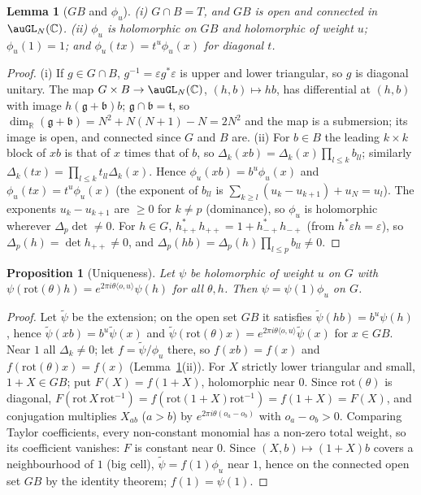 \documentclass[10pt]{amsart}
\newtheorem{proposition}[theorem]{Proposition}
\newtheorem{lemma}[theorem]{Lemma}
\theoremstyle{definition}
\theoremstyle{remark}
\newcommand{\C}{\mathbb C}
\newcommand{\R}{\mathbb R}
\begin{document}
\begin{lemma}[$G B$ and $\phi_u$]\label{psq:GB}
\textup{(i)} $G\cap B=T$, and $GB$ is open and connected in $\auGL_N(\C)$. \textup{(ii)} $\phi_u$ is
holomorphic on $GB$ and holomorphic of weight $u$; $\phi_u(1)=1$; and $\phi_u(tx)=t^u\phi_u(x)$ for
diagonal $t$.
\end{lemma}
\begin{proof}
(i) If $g\in G\cap B$, $g^{-1}=\varepsilon g^*\varepsilon$ is upper and lower triangular, so $g$ is diagonal
unitary. The map $G\times B\to\auGL_N(\C)$, $(h,b)\mapsto hb$, has differential at $(h,b)$ with image
$h(\mathfrak g+\mathfrak b)b$; $\mathfrak g\cap\mathfrak b=\mathfrak t$, so $\dim_\R(\mathfrak g+\mathfrak b)
=N^2+N(N+1)-N=2N^2$ and the map is a submersion; its image is open, and connected since $G$ and $B$
are. (ii) For $b\in B$ the leading $k\times k$ block of $xb$ is that of $x$ times that of $b$, so
$\Delta_k(xb)=\Delta_k(x)\prod_{l\le k}b_{ll}$; similarly $\Delta_k(tx)=\prod_{l\le k}t_{ll}\Delta_k(x)$.
Hence $\phi_u(xb)=b^u\phi_u(x)$ and $\phi_u(tx)=t^u\phi_u(x)$ (the exponent of $b_{ll}$ is
$\sum_{k\ge l}(u_k-u_{k+1})+u_N=u_l$). The exponents $u_k-u_{k+1}$ are $\ge0$ for $k\ne p$ (dominance),
so $\phi_u$ is holomorphic wherever $\Delta_p\det\ne0$. For $h\in G$, $h_{++}^*h_{++}=1+h_{-+}^*h_{-+}$
(from $h^*\varepsilon h=\varepsilon$), so $\Delta_p(h)=\det h_{++}\ne0$, and $\Delta_p(hb)=\Delta_p(h)\prod_{l\le p}
b_{ll}\ne0$.
\end{proof}

\begin{proposition}[Uniqueness]\label{psq:unique}
Let $\psi$ be holomorphic of weight $u$ on $G$ with $\psi(\mathrm{rot}(\theta)h)=e^{2\pi i\theta\langle
o,u\rangle}\psi(h)$ for all $\theta,h$. Then $\psi=\psi(1)\phi_u$ on $G$.
\end{proposition}
\begin{proof}
Let $\tilde\psi$ be the extension; on the open set $GB$ it satisfies $\tilde\psi(hb)=b^u\psi(h)$, hence
$\tilde\psi(xb)=b^u\tilde\psi(x)$ and $\tilde\psi(\mathrm{rot}(\theta)x)=e^{2\pi i\theta\langle o,u\rangle}
\tilde\psi(x)$ for $x\in GB$. Near $1$ all $\Delta_k\ne0$; let $f=\tilde\psi/\phi_u$ there, so
$f(xb)=f(x)$ and $f(\mathrm{rot}(\theta)x)=f(x)$ (Lemma~\ref{psq:GB}(ii)). For $X$ strictly lower
triangular and small, $1+X\in GB$; put $F(X)=f(1+X)$, holomorphic near $0$. Since $\mathrm{rot}(\theta)$ is
diagonal, $F(\mathrm{rot}\,X\,\mathrm{rot}^{-1})=f(\mathrm{rot}(1+X)\mathrm{rot}^{-1})=f(1+X)=F(X)$, and
conjugation multiplies $X_{ab}$ ($a>b$) by $e^{2\pi i\theta(o_a-o_b)}$ with $o_a-o_b>0$. Comparing
Taylor coefficients, every non-constant monomial has a non-zero total weight, so its coefficient
vanishes: $F$ is constant near $0$. Since $(X,b)\mapsto(1+X)b$ covers a neighbourhood of $1$ (big
cell), $\tilde\psi=f(1)\phi_u$ near $1$, hence on the connected open set $GB$ by the identity theorem;
$f(1)=\psi(1)$.
\end{proof}
\end{document}
